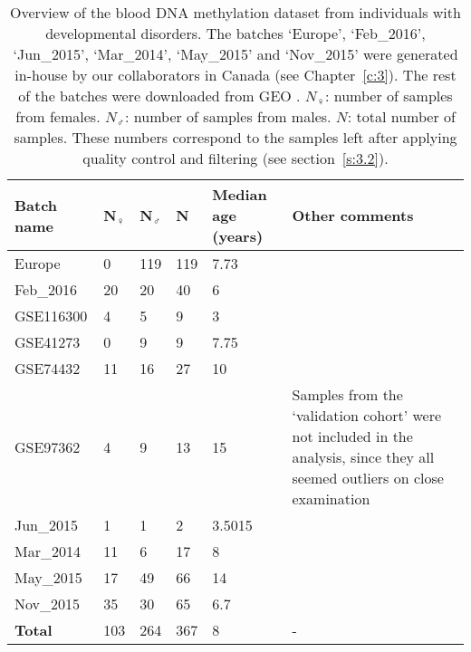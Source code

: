 \begin{table}[h]
	\centering
	\small
	\begin{tabular}{ p{2cm} p{1cm} p{1cm} p{1cm} p{2cm} p{6cm} }
		\toprule
		\textbf{Batch name} & \textbf{N$_{\female}$} & \textbf{N$_{\male}$} & \textbf{N} & \textbf{Median age (years)} & \textbf{Other comments} \\
		\midrule
		  Europe & 0 & 119 & 119 & 7.73 & \\
		  Feb\_2016 & 20 & 20 & 40 & 6 & \\
		  GSE116300 & 4 & 5 & 9 & 3 &\\
		  GSE41273 & 0 & 9 & 9 & 7.75 & \\
		  GSE74432 & 11 & 16 & 27 & 10 & \\
		  GSE97362 & 4 & 9 & 13 & 15 & Samples from the `validation cohort' were not included in the analysis, since they all seemed outliers on close examination\\
		  Jun\_2015 & 1 & 1 & 2 & 3.5015 & \\
		  Mar\_2014 & 11 & 6 & 17 & 8 & \\
		  May\_2015 & 17 & 49 & 66 & 14 & \\
		  Nov\_2015 & 35 & 30 & 65 & 6.7 & \\
		\midrule
		\textbf{Total} & 103 & 264 & 367 & 8 & - \\ 
		\bottomrule
	\end{tabular}
	\vspace*{3mm}
	\caption[Additional information for the developmental disorders dataset]{Overview of the blood DNA methylation dataset from individuals with developmental disorders. The batches `Europe', `Feb\_2016', `Jun\_2015', `Mar\_2014', `May\_2015' and `Nov\_2015' were generated in-house by our collaborators in Canada (see Chapter~\ref{c:3}). The rest of the batches were downloaded from GEO \cite{Edgar2002}. $N_{\female}$: number of samples from females. $N_{\male}$: number of samples from males. $N$: total number of samples. These numbers correspond to the samples left after applying quality control and filtering (see section~\ref{s:3.2}).}
	\label{table:s2_table1}
\end{table} 

\smallskip

\clearpage

